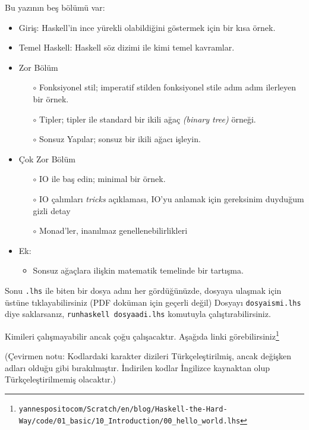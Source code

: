 \documentclass[a4paper,14pt,openany]{extbook} %
\let\emph\textit
\begin{document}
\pagebreak
Bu yazının beş bölümü var:
\begin{itemize}
\item Giriş: Haskell'in ince yürekli olabildiğini göstermek için bir kısa örnek.
\item Temel Haskell: Haskell söz dizimi ile kimi temel kavramlar.
\item Zor Bölüm
  \begin{itemize}
  \item[$\circ$] Fonksiyonel stil; imperatif stilden fonksiyonel stile
    adım adım ilerleyen bir örnek.
  \item[$\circ$] Tipler; tipler ile standard bir ikili ağaç \emph{(binary tree)} örneği.
  \item[$\circ$] Sonsuz Yapılar; sonsuz bir ikili ağacı işleyin.
  \end{itemize}
\item Çok Zor Bölüm
  \begin{itemize}
  \item[$\circ$] IO ile baş edin; minimal bir örnek.
  \item[$\circ$] IO çalımları \emph{tricks} %
    açıklaması, IO'yu anlamak için gereksinim duyduğum gizli detay
  \item[$\circ$] Monad'ler, inanılmaz genellenebilirlikleri
  \end{itemize}
\item Ek:
  \begin{itemize}
\item Sonsuz ağaçlara ilişkin matematik temelinde bir tartışma.
  \end{itemize}
\end{itemize}

Sonu \lstinline!.lhs! ile biten bir dosya adını %
her gördüğünüzde,
dosyaya ulaşmak için üstüne tıklayabilirsiniz (PDF doküman için geçerli değil)
Dosyayı \lstinline!dosyaismi.lhs! diye saklarsanız,
\lstinline!runhaskell dosyaadi.lhs! komutuyla çalıştırabilirsiniz.

Kimileri çalışmayabilir ancak çoğu çalışacaktır. Aşağıda linki
görebilirsiniz\footnote{\texttt{yannesposito\centerdot com/Scratch/en/blog/Haskell-the-Hard-Way/code/01\_basic/10\_Introduction/00\_hello\_world.lhs}}

(Çevirmen notu: Kodlardaki karakter dizileri Türkçeleştirilmiş, ancak
değişken adları olduğu gibi bırakılmıştır. İndirilen kodlar İngilizce
kaynaktan olup Türkçeleştirilmemiş olacaktır.)
\pagebreak
\end{document}
